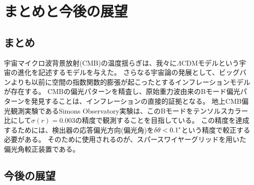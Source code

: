 \documentclass[../../main.tex]{subfiles}
\begin{document}
\chapter{まとめと今後の展望}
\section{まとめ}
宇宙マイクロ波背景放射(CMB)の温度揺らぎは、我々に$\Lambda \mathrm{CDM}$モデルという宇宙の進化を記述するモデルを与えた。
さらなる宇宙論の発展として、ビッグバンよりも以前に空間の指数関数的膨張が起こったとするインフレーションモデルが存在する。
CMBの偏光パターンを精査し、原始重力波由来のBモード偏光パターンを発見することは、インフレーションの直接的証拠となる。
地上CMB偏光観測実験であるSimons Observatory実験は、このBモードをテンソルスカラー比にして$\sigma(r)=0.003$の精度で観測することを目指している。
この精度を達成するためには、検出器の応答偏光方向(偏光角)を$\delta\theta<0.1\tcdegree$という精度で較正する必要がある。
そのために使用されるのが、スパースワイヤーグリッドを用いた偏光角較正装置である。



\section{今後の展望}
\end{document}
